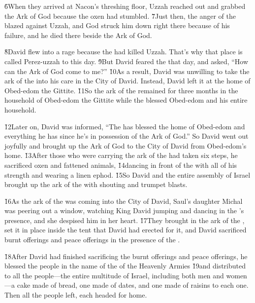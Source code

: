 \v{6}When they arrived at Nacon's threshing floor, Uzzah reached out and grabbed the Ark of God because the oxen had stumbled. \v{7}Just then, the anger of the  blazed against Uzzah, and God struck him down right there because of his failure, and he died there beside the Ark of God.

\v{8}David flew into a rage because the  had killed Uzzah. That's why that place is called Perez-uzzah to this day. \v{9}But David feared the  that day, and asked, ``How can the Ark of God come to me?'' \v{10}As a result, David was unwilling to take the ark of the  into his care in the City of David. Instead, David left it at the home of Obed-edom the Gittite. \v{11}So the ark of the  remained for three months in the household of Obed-edom the Gittite while the  blessed Obed-edom and his entire household.

\v{12}Later on, David was informed, ``The  has blessed the home of Obed-edom and everything he has since he's in possession of the Ark of God.'' So David went out joyfully and brought up the Ark of God to the City of David from Obed-edom's home. \v{13}After those who were carrying the ark of the  had taken six steps, he sacrificed oxen and fattened animals, \v{14}dancing in front of the  with all of his strength and wearing a linen ephod. \v{15}So David and the entire assembly of Israel brought up the ark of the  with shouting and trumpet blasts.

\v{16}As the ark of the  was coming into the City of David, Saul's daughter Michal was peering out a window, watching King David jumping and dancing in the 's presence, and she despised him in her heart. \v{17}They brought in the ark of the , set it in place inside the tent that David had erected for it, and David sacrificed burnt offerings and peace offerings in the presence of the .

\v{18}After David had finished sacrificing the burnt offerings and peace offerings, he blessed the people in the name of the  of the Heavenly Armies \v{19}and distributed to all the people---the entire multitude of Israel, including both men and women---a cake made of bread, one made of dates, and one made of raisins to each one. Then all the people left, each headed for home.

